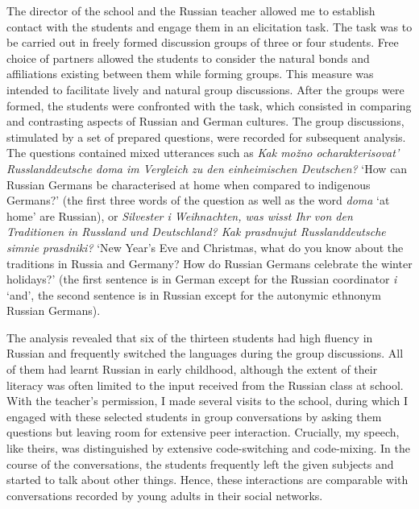The director of the school and the Russian teacher allowed me to establish contact with the students and engage them in an elicitation task. The task was to be carried out in freely formed discussion groups of three or four students. Free choice of partners allowed the students to consider the natural bonds and affiliations existing between them while forming groups. This measure was intended to facilitate lively and natural group discussions. After the groups were formed, the students were confronted with the task, which consisted in comparing and contrasting aspects of Russian and German cultures. The group discussions, stimulated by a set of prepared questions, were recorded for subsequent analysis. The questions contained mixed utterances such as \textit{Kak mo\v{z}no ocharakterisovat' Russlanddeutsche doma im Vergleich zu den einheimischen Deutschen?} `How can Russian Germans be characterised at home when compared to indigenous Germans?' (the first three words of the question as well as the word \textit{doma} `at home' are Russian), or \textit{Silvester i Weihnachten, was wisst Ihr von den Traditionen in Russland und Deutschland? Kak prasdnujut Russlanddeutsche simnie prasdniki?} `New Year's Eve and Christmas, what do you know about the traditions in Russia and Germany? How do Russian Germans celebrate the winter holidays?' (the first sentence is in German except for the Russian coordinator \textit{i} `and', the second sentence is in Russian except for the autonymic ethnonym Russian Germans). 

The analysis revealed that six of the thirteen students had high fluency in Russian and frequently switched the languages during the group discussions. All of them had learnt Russian in early childhood, although the extent of their literacy was often limited to the input received from the Russian class at school. With the teacher's permission, I made several visits to the school, during which I engaged with these selected students in group conversations by asking them questions but leaving room for extensive peer interaction. Crucially, my speech, like theirs, was distinguished by extensive code-switching and code-mixing. In the course of the conversations, the students frequently left the given subjects and started to talk about other things. Hence, these interactions are comparable with conversations recorded by young adults in their social networks.

